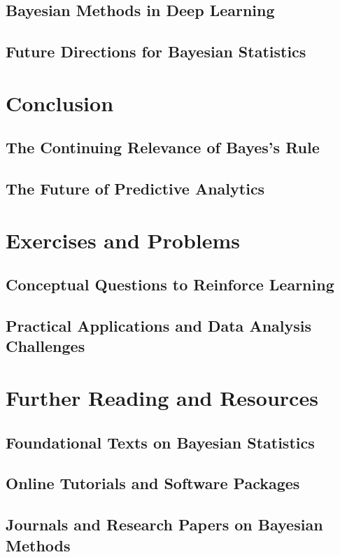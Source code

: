 \documentclass[12pt]{book} %
\begin{document}
\subsection{Bayesian Methods in Deep Learning}
\subsection{Future Directions for Bayesian Statistics}

\section{Conclusion}
\subsection{The Continuing Relevance of Bayes's Rule}
\subsection{The Future of Predictive Analytics}

\section{Exercises and Problems}
\subsection{Conceptual Questions to Reinforce Learning}
\subsection{Practical Applications and Data Analysis Challenges}

\section{Further Reading and Resources}
\subsection{Foundational Texts on Bayesian Statistics}
\subsection{Online Tutorials and Software Packages}
\subsection{Journals and Research Papers on Bayesian Methods}
\end{document}
